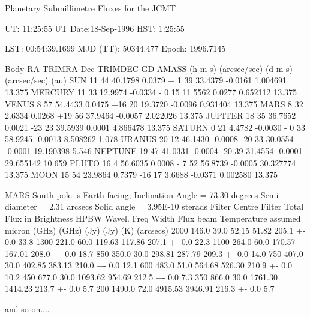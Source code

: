 \documentclass[11pt,twoside]{starlink}
\begin{document}
\begin{small}
\begin{terminalv}
Planetary Submillimetre Fluxes for the JCMT

UT:  11:25:55       UT Date:18-Sep-1996     HST: 1:25:55

LST: 00:54:39.1699  MJD (TT):    50344.477  Epoch: 1996.7145

Body         RA        TRIMRA         Dec       TRIMDEC        GD     AMASS
           (h m s)  (arcsec/sec)    (d m s)  (arcsec/sec)     (au)
SUN     11 44 40.1798  0.0379   + 1 39 33.4379  -0.0161    1.004691  13.375
MERCURY 11 33 12.9974 -0.0334   - 0 15 11.5562   0.0277    0.652112  13.375
VENUS    8 57 54.4433  0.0475   +16 20 19.3720  -0.0096    0.931404  13.375
MARS     8 32  2.6334  0.0268   +19 56 37.9464  -0.0057    2.022026  13.375
JUPITER 18 35 36.7652  0.0021   -23 23 39.5939   0.0001    4.866478  13.375
SATURN   0 21  4.4782 -0.0030   - 0 33 58.9245  -0.0013    8.508262   1.078
URANUS  20 12 46.1430 -0.0008   -20 33 30.0554  -0.0001   19.190398   5.546
NEPTUNE 19 47 41.0331 -0.0004   -20 39 31.4554  -0.0001   29.655142  10.659
PLUTO   16  4 56.6035  0.0008   - 7 52 56.8739  -0.0005   30.327774  13.375
MOON    15 54 23.9864  0.7379   -16 17  3.6688  -0.0371    0.002580  13.375
\end{terminalv}
\end{small}

\begin{small}
\begin{terminalv}
MARS
South pole is Earth-facing; Inclination Angle =  73.30 degrees
Semi-diameter =  2.31 arcsecs    Solid angle =  3.95E-10 sterads
Filter    Centre   Filter   Total    Flux in    Brightness         HPBW
Wavel.     Freq     Width    Flux     beam      Temperature       assumed
micron     (GHz)    (GHz)    (Jy)      (Jy)         (K)          (arcsecs)
 2000      146.0    39.0     52.15     51.82    205.1 +-  0.0       33.8
 1300      221.0    60.0    119.63    117.86    207.1 +-  0.0       22.3
 1100      264.0    60.0    170.57    167.01    208.0 +-  0.0       18.7
  850      350.0    30.0    298.81    287.79    209.3 +-  0.0       14.0
  750      407.0    30.0    402.85    383.13    210.0 +-  0.0       12.1
  600      483.0    51.0    564.68    526.30    210.9 +-  0.0       10.2
  450      677.0    30.0   1093.62    954.69    212.5 +-  0.0        7.3
  350      866.0    30.0   1761.30   1414.23    213.7 +-  0.0        5.7
  200     1490.0    72.0   4915.53   3946.91    216.3 +-  0.0        5.7
\end{terminalv}
\end{small}
and so on....
\end{document}
